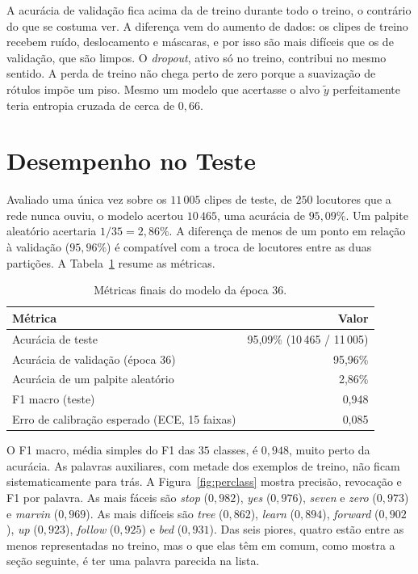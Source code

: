 \documentclass[11pt,a4paper]{article}
\newcommand{\w}[1]{\textit{#1}}
\begin{document}
A acurácia de validação fica acima da de treino durante todo o treino, o contrário do que se costuma ver. A diferença vem do aumento de dados: os clipes de treino recebem ruído, deslocamento e máscaras, e por isso são mais difíceis que os de validação, que são limpos. O \textit{dropout}, ativo só no treino, contribui no mesmo sentido. A perda de treino não chega perto de zero porque a suavização de rótulos impõe um piso. Mesmo um modelo que acertasse o alvo $\tilde{y}$ perfeitamente teria entropia cruzada de cerca de $0{,}66$.

\section{Desempenho no Teste}

Avaliado uma única vez sobre os $11\,005$ clipes de teste, de $250$ locutores que a rede nunca ouviu, o modelo acertou $10\,465$, uma acurácia de $95{,}09\%$. Um palpite aleatório acertaria $1/35 = 2{,}86\%$. A diferença de menos de um ponto em relação à validação ($95{,}96\%$) é compatível com a troca de locutores entre as duas partições. A Tabela~\ref{tab:final} resume as métricas.

\begin{table}[H]
\centering
\caption{Métricas finais do modelo da época $36$.}
\label{tab:final}
\small
\begin{tabular}{lr}
\toprule
Métrica & Valor \\
\midrule
Acurácia de teste & 95,09\% (10\,465 / 11\,005) \\
Acurácia de validação (época 36) & 95,96\% \\
Acurácia de um palpite aleatório & 2,86\% \\
F1 macro (teste) & 0,948 \\
Erro de calibração esperado (ECE, 15 faixas) & 0,085 \\
\bottomrule
\end{tabular}
\end{table}

O F1 macro, média simples do F1 das $35$ classes, é $0{,}948$, muito perto da acurácia. As palavras auxiliares, com metade dos exemplos de treino, não ficam sistematicamente para trás. A Figura~\ref{fig:perclass} mostra precisão, revocação e F1 por palavra. As mais fáceis são \w{stop} ($0{,}982$), \w{yes} ($0{,}976$), \w{seven} e \w{zero} ($0{,}973$) e \w{marvin} ($0{,}969$). As mais difíceis são \w{tree} ($0{,}862$), \w{learn} ($0{,}894$), \w{forward} ($0{,}902$), \w{up} ($0{,}923$), \w{follow} ($0{,}925$) e \w{bed} ($0{,}931$). Das seis piores, quatro estão entre as menos representadas no treino, mas o que elas têm em comum, como mostra a seção seguinte, é ter uma palavra parecida na lista.
\end{document}
